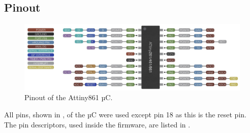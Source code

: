 \subsection{Pinout}

\begin{figure}[!ht]
    \centering
    \includegraphics[width=13cm]{./Figures/attiny861_pinout.jpg}
    \caption{Pinout of the Attiny861 µC.}
    \label{fig:attiny861_pinout}     
\end{figure}


\noindent All pins, shown in , of the µC were used except pin 18 as this is the reset pin. The pin descriptors, used inside the firmware, are listed in .

